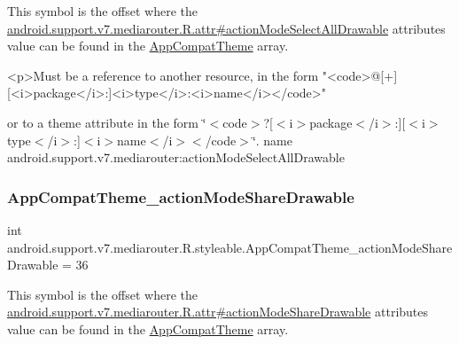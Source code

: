 This symbol is the offset where the \hyperlink{classandroid_1_1support_1_1v7_1_1mediarouter_1_1R_1_1attr_a06a8af9b5fdcb81fe91facc4e5cf9781}{android.\+support.\+v7.\+mediarouter.\+R.\+attr\#action\+Mode\+Select\+All\+Drawable} attribute\textquotesingle{}s value can be found in the \hyperlink{classandroid_1_1support_1_1v7_1_1mediarouter_1_1R_1_1styleable_a4e3d3900c75d49aeb2f283cac00214d6}{App\+Compat\+Theme} array.

\begin{DoxyVerb}      <p>Must be a reference to another resource, in the form "<code>@[+][<i>package</i>:]<i>type</i>:<i>name</i></code>"
\end{DoxyVerb}
 or to a theme attribute in the form \char`\"{}$<$code$>$?\mbox{[}$<$i$>$package$<$/i$>$\+:\mbox{]}\mbox{[}$<$i$>$type$<$/i$>$\+:\mbox{]}$<$i$>$name$<$/i$>$$<$/code$>$\char`\"{}.  name android.\+support.\+v7.\+mediarouter\+:action\+Mode\+Select\+All\+Drawable \mbox{\label{classandroid_1_1support_1_1v7_1_1mediarouter_1_1R_1_1styleable_a305e4c84830a00514e165895e02e495b}} 
\subsubsection{\texorpdfstring{App\+Compat\+Theme\+\_\+action\+Mode\+Share\+Drawable}{AppCompatTheme\_actionModeShareDrawable}}
{\footnotesize\ttfamily int android.\+support.\+v7.\+mediarouter.\+R.\+styleable.\+App\+Compat\+Theme\+\_\+action\+Mode\+Share\+Drawable = 36\hspace{0.3cm}{\ttfamily [static]}}

This symbol is the offset where the \hyperlink{classandroid_1_1support_1_1v7_1_1mediarouter_1_1R_1_1attr_a9ee38f4e5bf0894aeb5da86ae98afb1a}{android.\+support.\+v7.\+mediarouter.\+R.\+attr\#action\+Mode\+Share\+Drawable} attribute\textquotesingle{}s value can be found in the \hyperlink{classandroid_1_1support_1_1v7_1_1mediarouter_1_1R_1_1styleable_a4e3d3900c75d49aeb2f283cac00214d6}{App\+Compat\+Theme} array.

